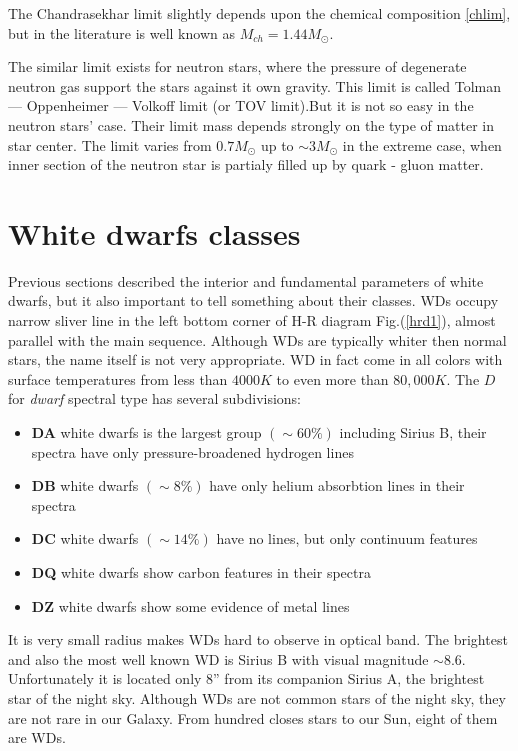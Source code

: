 \documentclass[oneside,a4paper,11pt]{report}
\begin{document}
The Chandrasekhar limit slightly depends upon the chemical composition \eqref{chlim}, but in the literature is well known as $M_{ch} = 1.44M_\odot$.    
  
The similar limit exists for neutron stars, where the pressure of degenerate neutron gas support the stars against it own gravity. 
This limit is called Tolman --- Oppenheimer --- Volkoff limit (or TOV limit).But it is not so easy in the neutron stars' case. Their limit 
mass depends strongly on the type of matter in star center. The limit varies from $0.7 M_\odot$ up to $\sim 3M_\odot$ in the extreme case, when inner section of 
the neutron star is partialy filled up by quark - gluon matter.     


\section{White dwarfs classes}
Previous sections described the interior and fundamental parameters of white dwarfs, but it also important to tell something about their classes.   
WDs occupy narrow sliver line in the left bottom corner of H-R diagram Fig.(\ref{hrd1}), almost parallel with the main sequence.  
Although WDs are typically whiter then normal stars, the name itself is not very appropriate. WD in fact come in all colors with surface 
temperatures from less than $4000K$ to even more than $80,000K$. The $D$ for \textit{dwarf} spectral type has several subdivisions:
\begin{itemize}
 \item \textbf{DA} white dwarfs is the largest group $(\sim 60\%)$ including Sirius B, their spectra have only pressure-broadened hydrogen lines 
 \item \textbf{DB} white dwarfs $(\sim 8\%)$ have only helium absorbtion lines in their spectra 
 \item \textbf{DC} white dwarfs $(\sim 14\%)$ have no lines, but only continuum features
 \item \textbf{DQ} white dwarfs show carbon features in their spectra
 \item \textbf{DZ} white dwarfs show some evidence of metal lines
\end{itemize}

It is very small radius makes WDs hard to observe in optical band. The brightest and also the most well known WD is Sirius B with visual magnitude $\sim8.6$. 
Unfortunately it is located only $8”$ from its companion Sirius A, the brightest star of the night sky. Although WDs are not common stars 
of the  night sky, they are not rare in our Galaxy. From hundred closes stars to our Sun, eight of them are WDs.
\end{document}
